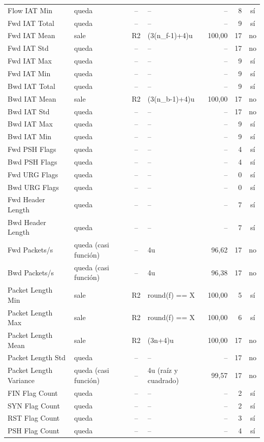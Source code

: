 \begin{longtable}{@{}>{\raggedright\arraybackslash}p{3.6cm}>{\raggedright\arraybackslash}p{2.3cm}c>{\raggedright\arraybackslash}p{3.6cm}rrc@{}}
Flow IAT Min & queda & -- & -- & -- & 8 & sí \\
Fwd IAT Total & queda & -- & -- & -- & 9 & sí \\
Fwd IAT Mean & sale & R2 & (3(n\_f-1)+4)u & 100{,}00 & 17 & no \\
Fwd IAT Std & queda & -- & -- & -- & 17 & no \\
Fwd IAT Max & queda & -- & -- & -- & 9 & sí \\
Fwd IAT Min & queda & -- & -- & -- & 9 & sí \\
Bwd IAT Total & queda & -- & -- & -- & 9 & sí \\
Bwd IAT Mean & sale & R2 & (3(n\_b-1)+4)u & 100{,}00 & 17 & no \\
Bwd IAT Std & queda & -- & -- & -- & 17 & no \\
Bwd IAT Max & queda & -- & -- & -- & 9 & sí \\
Bwd IAT Min & queda & -- & -- & -- & 9 & sí \\
Fwd PSH Flags & queda & -- & -- & -- & 4 & sí \\
Bwd PSH Flags & queda & -- & -- & -- & 4 & sí \\
Fwd URG Flags & queda & -- & -- & -- & 0 & sí \\
Bwd URG Flags & queda & -- & -- & -- & 0 & sí \\
Fwd Header Length & queda & -- & -- & -- & 7 & sí \\
Bwd Header Length & queda & -- & -- & -- & 7 & sí \\
Fwd Packets/s & queda (casi función) & -- & 4u & 96{,}62 & 17 & no \\
Bwd Packets/s & queda (casi función) & -- & 4u & 96{,}38 & 17 & no \\
Packet Length Min & sale & R2 & round(f) == X & 100{,}00 & 5 & sí \\
Packet Length Max & sale & R2 & round(f) == X & 100{,}00 & 6 & sí \\
Packet Length Mean & sale & R2 & (3n+4)u & 100{,}00 & 17 & no \\
Packet Length Std & queda & -- & -- & -- & 17 & no \\
Packet Length Variance & queda (casi función) & -- & 4u (raíz y cuadrado) & 99{,}57 & 17 & no \\
FIN Flag Count & queda & -- & -- & -- & 2 & sí \\
SYN Flag Count & queda & -- & -- & -- & 2 & sí \\
RST Flag Count & queda & -- & -- & -- & 3 & sí \\
PSH Flag Count & queda & -- & -- & -- & 4 & sí \\

\end{longtable}
